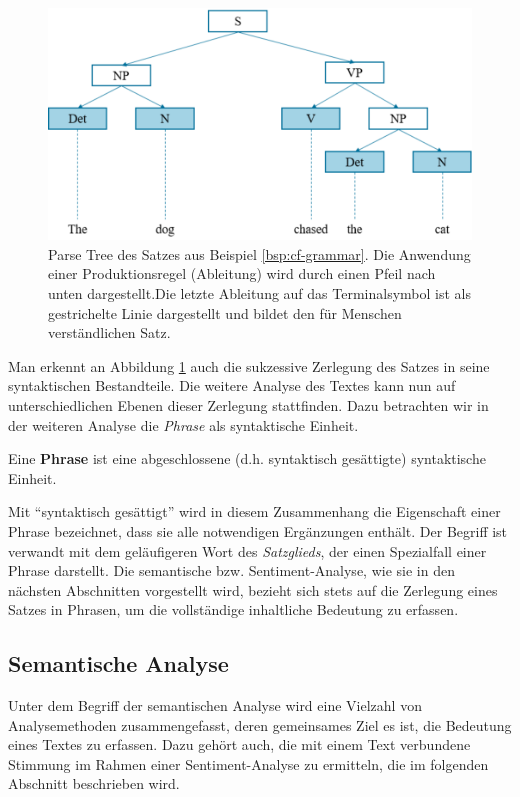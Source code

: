 \documentclass[
	a4paper,
	12pt,
	bibliography=totocnumbered,
	twoside,
]{scrreprt}
\begin{document}
\begin{figure}[hbt!]
    \centering
    \includegraphics[width=.8\textwidth]{images/grammar_parse_tree.eps}
    \caption[Darstellung eines Parse Trees]{Parse Tree des Satzes aus Beispiel \ref{bsp:cf-grammar}. Die Anwendung einer Produktionsregel (Ableitung) wird durch einen Pfeil nach unten dargestellt.Die letzte Ableitung auf das Terminalsymbol ist als gestrichelte Linie dargestellt und bildet den für Menschen verständlichen Satz\footnotemark.}
    \label{img:parse-tree}
\end{figure}

Man erkennt an Abbildung \ref{img:parse-tree} auch die sukzessive Zerlegung des Satzes in seine syntaktischen Bestandteile. Die weitere Analyse des Textes kann nun auf unterschiedlichen Ebenen dieser Zerlegung stattfinden. Dazu betrachten wir in der weiteren Analyse die \textit{Phrase} als syntaktische Einheit.\\

\begin{Definition}[Phrase]
    Eine \textbf{Phrase} ist eine abgeschlossene (d.h. syntaktisch gesättigte) syntaktische Einheit.
\end{Definition}

Mit "`syntaktisch gesättigt"' wird in diesem Zusammenhang die Eigenschaft einer Phrase bezeichnet, dass sie alle notwendigen Ergänzungen enthält. Der Begriff ist verwandt mit dem geläufigeren Wort des \textit{Satzglieds}, der einen Spezialfall einer Phrase darstellt. Die semantische bzw. Sentiment-Analyse, wie sie in den nächsten Abschnitten vorgestellt wird, bezieht sich stets auf die Zerlegung eines Satzes in Phrasen, um die vollständige inhaltliche Bedeutung zu erfassen.\\


\subsection*{Semantische Analyse}
Unter dem Begriff der semantischen Analyse wird eine Vielzahl von Analysemethoden zusammengefasst, deren gemeinsames Ziel es ist, die Bedeutung eines Textes zu erfassen. Dazu gehört auch, die mit einem Text verbundene Stimmung im Rahmen einer Sentiment-Analyse zu ermitteln, die im folgenden Abschnitt beschrieben wird.
\end{document}
